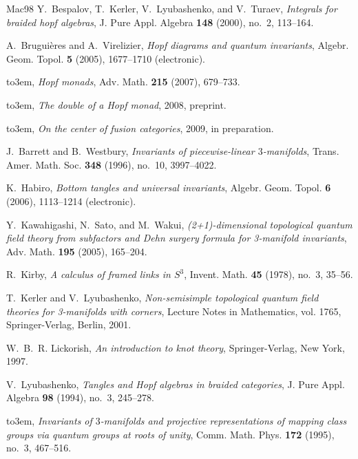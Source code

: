 \documentclass[a4paper]{amsart}
\theoremstyle{definition}
\providecommand{\bysame}{\leavevmode\hbox to3em{\hrulefill}\thinspace}
\begin{document}
\begin{thebibliography}{{Mac}98}
Y.~Bespalov, T.~Kerler, V.~Lyubashenko, and V.~Turaev, \emph{Integrals for
  braided hopf algebras}, J. Pure Appl. Algebra \textbf{148} (2000), no.~2,
  113--164.

A.~Brugui{\`e}res and A.~Virelizier, \emph{Hopf diagrams and quantum
  invariants}, Algebr. Geom. Topol. \textbf{5} (2005), 1677--1710 (electronic).

\bysame, \emph{Hopf monads}, Adv. Math. \textbf{215} (2007), 679--733.

\bysame, \emph{The double of a {H}opf monad}, 2008, preprint.

\bysame, \emph{On the center of fusion categories}, 2009, in preparation.

J.~Barrett and B.~Westbury, \emph{Invariants of piecewise-linear
  {$3$}-manifolds}, Trans. Amer. Math. Soc. \textbf{348} (1996), no.~10,
  3997--4022.

K.~Habiro, \emph{Bottom tangles and universal invariants}, Algebr. Geom. Topol.
  \textbf{6} (2006), 1113--1214 (electronic).

Y.~Kawahigashi, N.~Sato, and M.~Wakui, \emph{(2+1)-dimensional topological quantum field theory from subfactors and Dehn
surgery formula for 3-manifold invariants}, Adv. Math. \textbf{195} (2005), 165--204.

R.~Kirby, \emph{A calculus of framed links in ${S}^3$}, Invent. Math.
  \textbf{45} (1978), no.~3, 35--56.

T.~Kerler and V.~Lyubashenko, \emph{Non-semisimple topological quantum field
  theories for 3-manifolds with corners}, Lecture Notes in Mathematics, vol.
  1765, Springer-Verlag, Berlin, 2001.

W.~B.~R. Lickorish, \emph{An introduction to knot theory}, Springer-Verlag, New
  York, 1997.

V.~Lyubashenko, \emph{Tangles and {H}opf algebras in braided categories}, J.
  Pure Appl. Algebra \textbf{98} (1994), no.~3, 245--278.

\bysame, \emph{Invariants of $3$-manifolds and projective representations of
  mapping class groups via quantum groups at roots of unity}, Comm. Math. Phys.
  \textbf{172} (1995), no.~3, 467--516.


\end{thebibliography}
\end{document}
